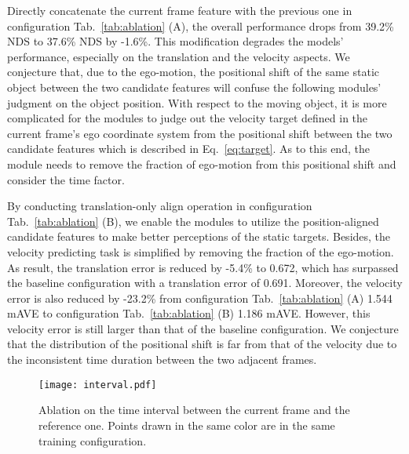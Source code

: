 \documentclass[10pt,twocolumn,letterpaper]{article}
\begin{document}
Directly concatenate the current frame feature with the previous one in configuration Tab.~\ref{tab:ablation} (A), the overall performance drops from 39.2\% NDS to 37.6\% NDS by -1.6\%. This modification degrades the models' performance, especially on the translation and the velocity aspects. We conjecture that, due to the ego-motion, the positional shift of the same static object between the two candidate features will confuse the following modules' judgment on the object position. With respect to the moving object, it is more complicated for the modules to judge out the velocity target defined in the current frame's ego coordinate system \cite{BEVDet} from the positional shift between the two candidate features which is described in Eq.~\ref{eq:target}. As to this end, the module needs to remove the fraction of ego-motion from this positional shift and consider the time factor.

By conducting translation-only align operation in configuration Tab.~\ref{tab:ablation} (B), we enable the modules to utilize the position-aligned candidate features to make better perceptions of the static targets. Besides, the velocity predicting task is simplified by removing the fraction of the ego-motion. As result, the translation error is reduced by -5.4\% to 0.672, which has surpassed the baseline configuration with a translation error of 0.691. Moreover, the velocity error is also reduced by -23.2\% from configuration Tab.~\ref{tab:ablation} (A) 1.544 mAVE to configuration Tab.~\ref{tab:ablation} (B) 1.186 mAVE. However, this velocity error is still larger than that of the baseline configuration. We conjecture that the distribution of the positional shift is far from that of the velocity due to the inconsistent time duration between the two adjacent frames.

\begin{figure}[t]
		\centering
		\texttt{[image: interval.pdf]}
		\caption{Ablation on the time interval between the current frame and the reference one. Points drawn in the same color are in the same training configuration.}
		\label{fig:interval}
\end{figure}
\end{document}
